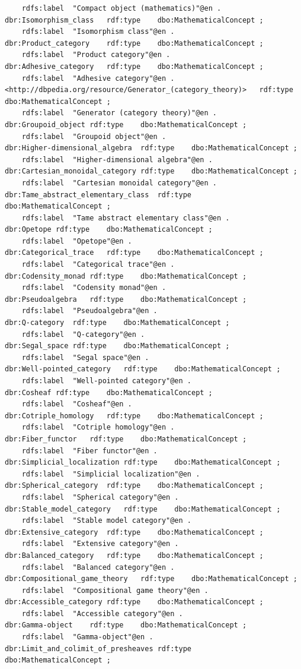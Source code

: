 \begin{verbatim}
	rdfs:label	"Compact object (mathematics)"@en .
dbr:Isomorphism_class	rdf:type	dbo:MathematicalConcept ;
	rdfs:label	"Isomorphism class"@en .
dbr:Product_category	rdf:type	dbo:MathematicalConcept ;
	rdfs:label	"Product category"@en .
dbr:Adhesive_category	rdf:type	dbo:MathematicalConcept ;
	rdfs:label	"Adhesive category"@en .
<http://dbpedia.org/resource/Generator_(category_theory)>	rdf:type	dbo:MathematicalConcept ;
	rdfs:label	"Generator (category theory)"@en .
dbr:Groupoid_object	rdf:type	dbo:MathematicalConcept ;
	rdfs:label	"Groupoid object"@en .
dbr:Higher-dimensional_algebra	rdf:type	dbo:MathematicalConcept ;
	rdfs:label	"Higher-dimensional algebra"@en .
dbr:Cartesian_monoidal_category	rdf:type	dbo:MathematicalConcept ;
	rdfs:label	"Cartesian monoidal category"@en .
dbr:Tame_abstract_elementary_class	rdf:type	dbo:MathematicalConcept ;
	rdfs:label	"Tame abstract elementary class"@en .
dbr:Opetope	rdf:type	dbo:MathematicalConcept ;
	rdfs:label	"Opetope"@en .
dbr:Categorical_trace	rdf:type	dbo:MathematicalConcept ;
	rdfs:label	"Categorical trace"@en .
dbr:Codensity_monad	rdf:type	dbo:MathematicalConcept ;
	rdfs:label	"Codensity monad"@en .
dbr:Pseudoalgebra	rdf:type	dbo:MathematicalConcept ;
	rdfs:label	"Pseudoalgebra"@en .
dbr:Q-category	rdf:type	dbo:MathematicalConcept ;
	rdfs:label	"Q-category"@en .
dbr:Segal_space	rdf:type	dbo:MathematicalConcept ;
	rdfs:label	"Segal space"@en .
dbr:Well-pointed_category	rdf:type	dbo:MathematicalConcept ;
	rdfs:label	"Well-pointed category"@en .
dbr:Cosheaf	rdf:type	dbo:MathematicalConcept ;
	rdfs:label	"Cosheaf"@en .
dbr:Cotriple_homology	rdf:type	dbo:MathematicalConcept ;
	rdfs:label	"Cotriple homology"@en .
dbr:Fiber_functor	rdf:type	dbo:MathematicalConcept ;
	rdfs:label	"Fiber functor"@en .
dbr:Simplicial_localization	rdf:type	dbo:MathematicalConcept ;
	rdfs:label	"Simplicial localization"@en .
dbr:Spherical_category	rdf:type	dbo:MathematicalConcept ;
	rdfs:label	"Spherical category"@en .
dbr:Stable_model_category	rdf:type	dbo:MathematicalConcept ;
	rdfs:label	"Stable model category"@en .
dbr:Extensive_category	rdf:type	dbo:MathematicalConcept ;
	rdfs:label	"Extensive category"@en .
dbr:Balanced_category	rdf:type	dbo:MathematicalConcept ;
	rdfs:label	"Balanced category"@en .
dbr:Compositional_game_theory	rdf:type	dbo:MathematicalConcept ;
	rdfs:label	"Compositional game theory"@en .
dbr:Accessible_category	rdf:type	dbo:MathematicalConcept ;
	rdfs:label	"Accessible category"@en .
dbr:Gamma-object	rdf:type	dbo:MathematicalConcept ;
	rdfs:label	"Gamma-object"@en .
dbr:Limit_and_colimit_of_presheaves	rdf:type	dbo:MathematicalConcept ;

\end{verbatim}
